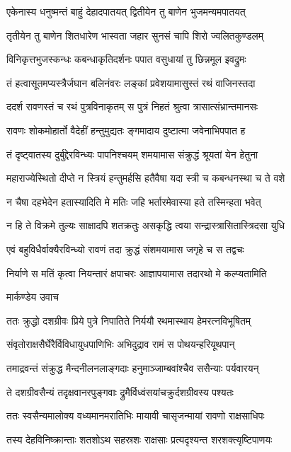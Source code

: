 \twolineshloka
{एकेनास्य धनुष्मन्तं बाहुं देहादपातयत्}
{द्वितीयेन तु बाणेन भुजमन्यमपातयत्}


\twolineshloka
{तृतीयेन तु बाणेन शितधारेण भास्वता}
{जहार सुनसं चापि शिरो ज्वलितकुण्डलम्}


\twolineshloka
{विनिकृत्तभुजस्कन्धः कबन्धाकृतिदर्शनः}
{पपात वसुधायां तु छिन्नमूल इवद्रुमः}


\twolineshloka
{तं हत्वासूतमप्यस्त्रैर्जघान बलिनंवरः}
{लङ्कां प्रवेशयामासुस्तं रथं वाजिनस्तदा}


\threelineshloka
{ददर्श रावणस्तं च रथं पुत्रविनाकृतम्}
{स पुत्रं निहतं श्रुत्वा त्रासात्संभ्रान्तमानसः}
{}


रावणः शोकमोहार्तो वैदेहीं हन्तुमुद्यतः
ङ्गमादाय दुष्टात्मा जवेनाभिपपात ह


\twolineshloka
{तं दृष्ट्वातस्य दुर्बुद्देरविन्ध्यः पापनिश्चयम्}
{शमयामास संक्रुद्धं श्रूयतां येन हेतुना}


\twolineshloka
{महाराज्येस्थितो दीप्ते न स्त्रियं हन्तुमर्हसि}
{हतैवैषा यदा स्त्री च कबन्धनस्था च ते वशे}


\twolineshloka
{न चैषा दहभेदेन हतास्यादिति मे मतिः}
{जहि भर्तारमेवास्या हते तस्मिन्हता भवेत्}


\twolineshloka
{न हि ते विक्रमे तुल्यः साक्षादपि शतक्रतुः}
{असकृद्धि त्वया सन्द्रास्त्रासितास्त्रिदसा युधि}


\twolineshloka
{एवं बहुविधैर्वाक्यैरविन्ध्यो रावणं तदा}
{क्रुद्धं संशमयामास जगृहे च स तद्वचः}


\twolineshloka
{निर्याणे स मतिं कृत्वा नियन्तारं क्षपाचरः}
{आज्ञापयामास तदारथो मे कल्प्यतामिति}


\twolineshloka
{मार्कण्डेय उवाच}
{}


\twolineshloka
{ततः क्रुद्धो दशग्रीवः प्रिये पुत्रे निपातिते}
{निर्ययौ रथमास्थाय हेमरत्नविभूषितम्}


\twolineshloka
{संवृतोराक्षसैर्घेरैर्विविधायुधपाणिभिः}
{अभिदुद्राव रामं स पोथयन्हरियूथपान्}


\twolineshloka
{तमाद्रवन्तं संक्रुद्ध मैन्दनीलनलाङ्गदाः}
{हनुमाञ्जाम्बवांश्चैव ससैन्याः पर्यवारयन्}


\twolineshloka
{ते दशग्रीवसैन्यं तदृक्षवानरपुङ्गवाः}
{द्रुमैर्विध्वंसयांचक्रुर्दशग्रीवस्य पश्यतः}


\twolineshloka
{ततः स्वसैन्यमालोक्य वध्यमानमरातिभिः}
{मायावी चासृजन्मायां रावणो राक्षसाधिपः}


\twolineshloka
{तस्य देहविनिष्क्रान्ताः शतशोऽथ सहस्रशः}
{राक्षसाः प्रत्यदृश्यन्त शरशक्त्यृष्टिपाणयः}


